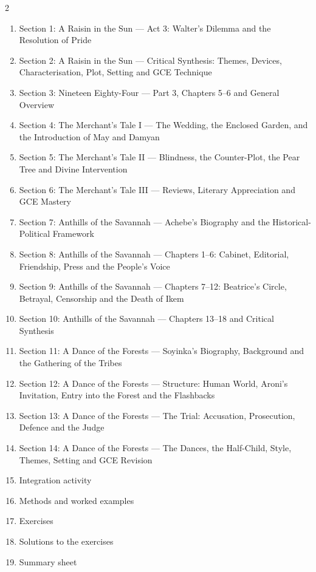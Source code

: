 \documentclass[11pt]{article}
\begin{document}
\begin{sommaire}
\begin{multicols}{2}
\begin{enumerate}
\item Section 1: A Raisin in the Sun — Act 3: Walter's Dilemma and the Resolution of Pride
\item Section 2: A Raisin in the Sun — Critical Synthesis: Themes, Devices, Characterisation, Plot, Setting and GCE Technique
\item Section 3: Nineteen Eighty-Four — Part 3, Chapters 5–6 and General Overview
\item Section 4: The Merchant's Tale I — The Wedding, the Enclosed Garden, and the Introduction of May and Damyan
\item Section 5: The Merchant's Tale II — Blindness, the Counter-Plot, the Pear Tree and Divine Intervention
\item Section 6: The Merchant's Tale III — Reviews, Literary Appreciation and GCE Mastery
\item Section 7: Anthills of the Savannah — Achebe's Biography and the Historical-Political Framework
\item Section 8: Anthills of the Savannah — Chapters 1–6: Cabinet, Editorial, Friendship, Press and the People's Voice
\item Section 9: Anthills of the Savannah — Chapters 7–12: Beatrice's Circle, Betrayal, Censorship and the Death of Ikem
\item Section 10: Anthills of the Savannah — Chapters 13–18 and Critical Synthesis
\item Section 11: A Dance of the Forests — Soyinka's Biography, Background and the Gathering of the Tribes
\item Section 12: A Dance of the Forests — Structure: Human World, Aroni's Invitation, Entry into the Forest and the Flashbacks
\item Section 13: A Dance of the Forests — The Trial: Accusation, Prosecution, Defence and the Judge
\item Section 14: A Dance of the Forests — The Dances, the Half-Child, Style, Themes, Setting and GCE Revision
\item Integration activity
\item Methods and worked examples
\item Exercises
\item Solutions to the exercises
\item Summary sheet
\end{enumerate}
\end{multicols}
\end{sommaire}
\end{document}
